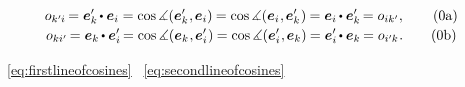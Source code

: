 {\nopagebreak\vspace{-0.2em}\en{\vspace{-0.3em}}
\begin{gather*}
\cosinematrix{k'\hspace{-0.1ex}i} \hspace{-0.2ex}
= \bm{e}'_{k} \hspace{-0.2ex} \dotp \bm{e}_i
= \operatorname{cos} \measuredangle (
    \bm{e}'_{k}
    \hspace{.1ex} , \hspace{-0.1ex}
    \bm{e}_i
) \hspace{-0.1ex}
= \operatorname{cos} \measuredangle (
    \bm{e}_{i}
    \hspace{.1ex} , \hspace{-0.1ex}
    \bm{e}'_{k}
\hspace{.1ex}) \hspace{-0.1ex}
= \bm{e}_{i} \hspace{-0.15ex} \dotp \bm{e}'_k \hspace{-0.25ex}
= \cosinematrix{ik'} ,
\tag{\theequation a}\label{eq:firstlineofcosines}
\\[-0.1em]
%
\cosinematrix{ki'} \hspace{-0.25ex}
= \bm{e}_k \hspace{-0.15ex} \dotp \bm{e}'_{i} \hspace{-0.25ex}
= \operatorname{cos} \measuredangle (
    \bm{e}_k
    \hspace{.1ex} , \hspace{-0.1ex}
    \bm{e}'_{i}
\hspace{.1ex} ) \hspace{-0.1ex}
= \operatorname{cos} \measuredangle (
    \bm{e}'_{i}
    \hspace{.1ex} , \hspace{-0.1ex}
    \bm{e}_k
) \hspace{-0.1ex}
= \bm{e}'_{i} \hspace{-0.2ex} \dotp \bm{e}_k \hspace{-0.2ex}
= \cosinematrix{i'\hspace{-0.1ex}k}
\hspace{.1ex} .
\tag{\theequation b}\label{eq:secondlineofcosines}
\end{gather*}

\noindent
{}~\eqref{eq:firstlineofcosines}
~\eqref{eq:secondlineofcosines}

}
